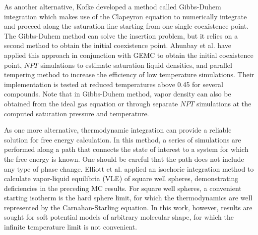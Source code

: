 \documentclass[5p,times]{elsarticle}
\begin{document}
As another alternative, Kofke \cite{Kofke1993b} developed a method called Gibbs-Duhem integration which makes use of the Clapeyron equation to numerically integrate and proceed along the saturation line starting from one single coexistence point. The Gibbs-Duhem method can solve the insertion problem, but it relies on a second method to obtain the initial coexistence point. Ahunbay et al. \cite{Ahunbay2004} have applied this approach in conjunction with GEMC 
to obtain the initial coexistence point, $NPT$ simulations to estimate saturation liquid densities, and parallel tempering method \cite{Yan1999} to increase the efficiency of low temperature simulations. Their implementation is tested at reduced temperatures above 0.45 for several compounds. Note that in Gibbs-Duhem method, vapor density can also be obtained from the ideal gas equation or through separate $NPT$ simulations at the computed saturation pressure and temperature.


As one more alternative, thermodynamic integration can provide a reliable solution for free energy calculation. In this method, a series of simulations are performed along a path that connects the state of interest to a system for which the free energy is known. One should be careful that the path does not include any type of phase change\cite{Vega2009}. Elliott et al. \cite{Elliott1999a} applied an isochoric integration method to calculate vapor-liquid equilibria (VLE) of square well spheres, demonstrating deficiencies in the preceding MC results.  For square well spheres, a convenient starting isotherm is the hard sphere limit, for which the thermodynamics are well represented by the Carnahan-Starling equation\cite{Carnahan1969a}. In this work, however, results are sought for soft potential models of arbitrary molecular shape, for which the infinite temperature limit is not convenient. 
\end{document}
